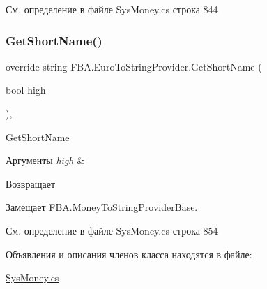 См. определение в файле Sys\+Money.\+cs строка 844

\mbox{\label{class_f_b_a_1_1_euro_to_string_provider_a86d24c3da503faee3603d111a65228ea}} 
\subsubsection{\texorpdfstring{Get\+Short\+Name()}{GetShortName()}}
{\footnotesize\ttfamily override string F\+B\+A.\+Euro\+To\+String\+Provider.\+Get\+Short\+Name (\begin{DoxyParamCaption}\item[{bool}]{high }\end{DoxyParamCaption})\hspace{0.3cm}{\ttfamily [protected]}, {\ttfamily [virtual]}}



Get\+Short\+Name 


\begin{DoxyParams}{Аргументы}
{\em high} & \\
\hline
\end{DoxyParams}
\begin{DoxyReturn}{Возвращает}

\end{DoxyReturn}


Замещает \mbox{\hyperlink{class_f_b_a_1_1_money_to_string_provider_base_a88f493205be3da3950e2175f1e033595}{F\+B\+A.\+Money\+To\+String\+Provider\+Base}}.



См. определение в файле Sys\+Money.\+cs строка 854



Объявления и описания членов класса находятся в файле\+:\begin{DoxyCompactItemize}
\item 
\mbox{\hyperlink{_sys_money_8cs}{Sys\+Money.\+cs}}\end{DoxyCompactItemize}
